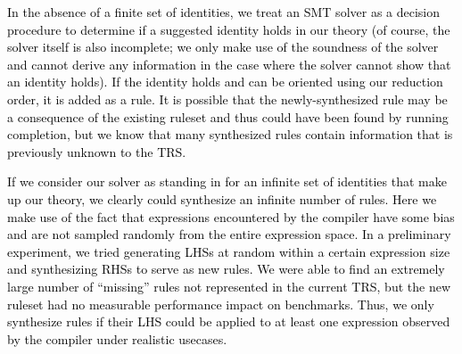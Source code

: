 \documentclass[acmsmall]{acmart}\settopmatter{}
\newcommand{\modified}[1]{\textcolor{black}{{#1}}}
\begin{document}

\modified{%
In the absence of a finite set of identities, we
treat an SMT solver as a decision procedure to determine if a suggested identity 
holds in our theory (of course, the solver itself is also incomplete; we only make use of the 
soundness of the solver and cannot derive any information in the case where the solver cannot
show that an identity holds). If the identity holds and can be oriented using our reduction order, 
it is added as a rule. It is possible that the newly-synthesized rule may be a consequence 
of the existing ruleset and thus could have been found by running completion, 
but we know that many synthesized rules contain information that is previously 
unknown to the TRS.}

\modified{If we consider our solver as standing in for an infinite set of identities that make up
our theory, we clearly could synthesize an infinite number of rules. Here we make use
of the fact that expressions encountered by the compiler have some bias 
and are not sampled randomly from the entire expression space. In a preliminary 
experiment, we tried generating LHSs at random within a certain expression size and 
synthesizing RHSs to serve as new rules. We were able to find an extremely large number of 
``missing'' rules not represented in the current TRS, but the new ruleset had 
no measurable performance impact on benchmarks. Thus, we only synthesize rules if their LHS could be 
applied to at least one expression observed by the compiler under realistic usecases. %
}
\end{document}
